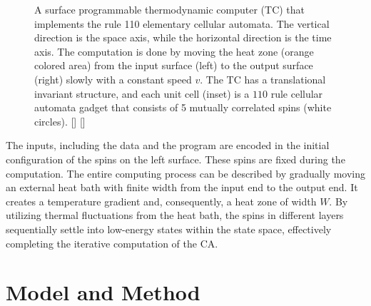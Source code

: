 \documentclass[twocolumn,superscriptaddress,english,showpacs,longbibliography]{revtex4-2}
\newcommand{\jinguo}[1]{[{\color{blue}{JGL: #1}}]}
\newcommand{\ym}[1]{[{\color{red}{YM: #1}}]}
\begin{document}
\begin{figure}[h]
\begin{tikzpicture}[x=0.75pt,y=0.75pt,yscale=-1,xscale=1, >=stealth]
    
    \end{tikzpicture}
    \caption{A surface programmable thermodynamic computer (TC) that implements the rule 110 elementary cellular automata. The vertical direction is the space axis,
    while the horizontal direction is the time axis.
    The computation is done by moving the heat zone (orange colored area) from the input surface (left) to the output surface (right) slowly with a constant speed $v$.
    The TC has a translational invariant structure, and each unit cell (inset) is a $110$ rule cellular automata gadget that consists of 5 mutually correlated spins (white circles).
    \ym{I add symbols. please check if i still need to put original captions here}
    \jinguo{please make the circles and texts in the inset larger}
    }
    
    \label{Surface-programmable-thermodynamic computer}
\end{figure}

The inputs, including the data and the program are encoded in the initial configuration of the spins on the left surface. These spins are fixed during the computation.
The entire computing process can be described by gradually moving an external heat bath with finite width from the input end to the output end.
It creates a temperature gradient and, consequently, a heat zone of width $W$. By utilizing thermal fluctuations from the heat bath, the spins in different layers sequentially settle into low-energy states within the state space, effectively completing the iterative computation of the CA.


\section{Model and Method}\label{sec:model-method}
\end{document}
